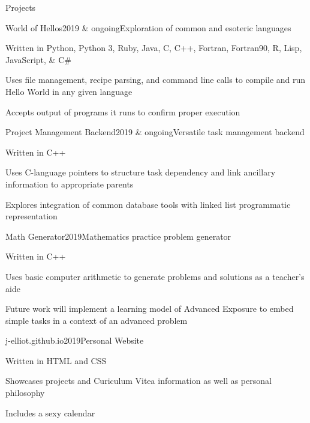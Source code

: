 \documentclass{resume} %
\begin{document}
\begin{rSection}{Projects}

\begin{rWorkSubsection}{World of Hellos}{2019 \& ongoing}{Exploration of common and esoteric languages}{}
\item Written in Python, Python 3, Ruby, Java, C, C++, Fortran, Fortran90, R, Lisp, JavaScript, \& C\#
\item Uses file management, recipe parsing, and command line calls to compile and run Hello World in any given language
\item Accepts output of programs it runs to confirm proper execution
\end{rWorkSubsection}
\fi

\begin{rWorkSubsection}{Project Management Backend}{2019 \& ongoing}{Versatile task management backend}{}
\item Written in C++
\item Uses C-language pointers to structure task dependency and link ancillary information to appropriate parents
\item Explores integration of common database tools with linked list programmatic representation
\end{rWorkSubsection}


\begin{rWorkSubsection}{Math Generator}{2019}{Mathematics practice problem generator}{}
\item Written in C++
\item Uses basic computer arithmetic to generate problems and solutions as a teacher's aide
\item Future work will implement a learning model of Advanced Exposure to embed simple tasks in a context of an advanced problem
\end{rWorkSubsection}


\begin{rWorkSubsection}{j-elliot.github.io}{2019}{Personal Website}{}
\item Written in HTML and CSS
\item Showcases projects and Curiculum Vitea information as well as personal philosophy
\item Includes a sexy calendar
\end{rWorkSubsection}


\end{rSection}
\end{document}
